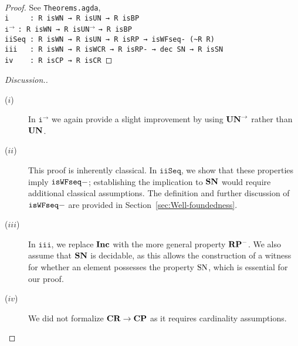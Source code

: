 \begin{proof}
    See \texttt{Theorems.agda},\\
    \verb|i     : R isWN → R isUN → R isBP|\\
    $\mathtt{i^\to}$\hspace{5mm} \verb|: R isWN → R |\texttt{isUN}$^{\to}$ \verb|→ R isBP|\\
    \verb|iiSeq : R isWN → R isUN → R isRP → isWFseq- (~R R)|\\
    \verb|iii   : R isWN → R isWCR → R isRP- → dec SN → R isSN|\\
    \verb|iv    : R isCP → R isCR|
\end{proof}
\begin{proof}[Discussion.]\hfill
  \begin{description}
    \item[($i$)] In $\mathtt{i^\to}$ we again provide a slight improvement by using $\mathbf{UN}^{\to}$ rather than $\mathbf{UN}$.
    \item[($ii$)] This proof is inherently classical. In $\mathtt{iiSeq}$, we show that these properties imply $\mathtt{isWFseq-}$; establishing the implication to $\mathbf{SN}$ would require additional classical assumptions. The definition and further discussion of $\mathtt{isWFseq-}$ are provided in Section~\ref{sec:Well-foundedness}.
    \item[($iii$)] In $\mathtt{iii}$, we replace $\mathbf{Inc}$ with the more general property $\mathbf{RP^{-}}$. We also assume that $\mathbf{SN}$ is decidable, as this allows the construction of a witness for whether an element possesses the property $\mathrm{SN}$, which is essential for our proof.
    \item[($iv$)] We did not formalize $\mathbf{CR} \to \mathbf{CP}$ as it requires cardinality assumptions. \qedhere
  \end{description}
\end{proof}

